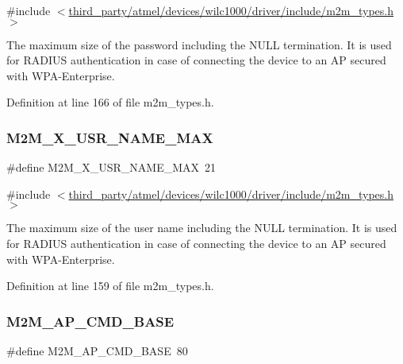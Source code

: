 {\ttfamily \#include $<$\hyperlink{m2m__types_8h}{third\+\_\+party/atmel/devices/wilc1000/driver/include/m2m\+\_\+types.\+h}$>$}

The maximum size of the password including the N\+U\+LL termination. It is used for R\+A\+D\+I\+US authentication in case of connecting the device to an AP secured with W\+P\+A-\/\+Enterprise. 

Definition at line 166 of file m2m\+\_\+types.\+h.

\mbox{\label{group__WlanDefines_ga0a22970c1dd8d0cb58c5c1b35217618d}} 
\subsubsection{\texorpdfstring{M2\+M\+\_\+X\+\_\+\+U\+S\+R\+\_\+\+N\+A\+M\+E\+\_\+\+M\+AX}{M2M\_1X\_USR\_NAME\_MAX}}
{\footnotesize\ttfamily \#define M2\+M\+\_\+X\+\_\+\+U\+S\+R\+\_\+\+N\+A\+M\+E\+\_\+\+M\+AX~21}



{\ttfamily \#include $<$\hyperlink{m2m__types_8h}{third\+\_\+party/atmel/devices/wilc1000/driver/include/m2m\+\_\+types.\+h}$>$}

The maximum size of the user name including the N\+U\+LL termination. It is used for R\+A\+D\+I\+US authentication in case of connecting the device to an AP secured with W\+P\+A-\/\+Enterprise. 

Definition at line 159 of file m2m\+\_\+types.\+h.

\mbox{\label{group__WlanDefines_gaf6815531611fc48229339c543f369a11}} 
\subsubsection{\texorpdfstring{M2\+M\+\_\+\+A\+P\+\_\+\+C\+M\+D\+\_\+\+B\+A\+SE}{M2M\_AP\_CMD\_BASE}}
{\footnotesize\ttfamily \#define M2\+M\+\_\+\+A\+P\+\_\+\+C\+M\+D\+\_\+\+B\+A\+SE~80}



